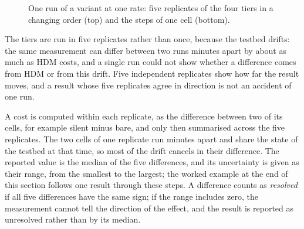 \documentclass{rptuma}
\begin{document}
\begin{figure}[htbp]
\centering
{}
\caption[One run of a variant at one rate.]{One run of a variant at one rate: five replicates of the four tiers in a changing order (top) and the steps of one cell (bottom).}
\label{fig:method.run}
\end{figure}

The tiers are run in five replicates rather than once, because the testbed drifts: the same
measurement can differ between two runs minutes apart by about as much as HDM costs, and a single
run could not show whether a difference comes from HDM or from this drift. Five independent
replicates show how far the result moves, and a result whose five replicates agree in direction is
not an accident of one run.

A cost is computed within each replicate, as the difference between two of its cells, for example
silent minus bare, and only then summarised across the five replicates. The two cells of one
replicate run minutes apart and share the state of the testbed at that time, so most of the drift
cancels in their difference. The reported value is
the median of the five differences,
and its uncertainty is given as their range, from the smallest to the largest; the worked example
at the end of this section follows one result through these steps. A difference counts as
\emph{resolved} if all five differences have the same sign; if the range includes zero, the
measurement cannot tell the direction of the effect, and the result is reported as unresolved
rather than by its median.
\end{document}

